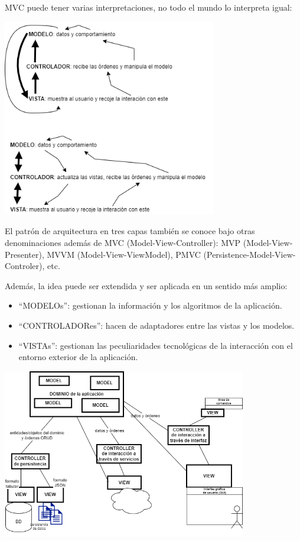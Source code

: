 \documentclass[spanish,12pt,a4paper,final,oneside]{book}
\begin{document}
MVC puede tener varias interpretaciones, no todo el mundo lo interpreta igual:
\begin{center}\includegraphics[width=0.7\textwidth]{division en capas - MVC - distintas interpretaciones}\end{center}

El patrón de arquitectura en tres capas también se conoce bajo otras denominaciones además de MVC ({\footnotesize Model-View-Controller}):  MVP ({\footnotesize Model-View-Presenter}), MVVM ({\footnotesize Model-View-ViewModel}), PMVC ({\footnotesize Persistence-Model-View-Controler}), etc.

Además, la idea puede ser extendida y ser aplicada en un sentido más amplio:
\begin{itemize}
\item ``MODELOs'': gestionan la información y los algoritmos de la aplicación.
\item ``CONTROLADORes'': hacen de adaptadores entre las vistas y los modelos.
\item ``VISTAs'': gestionan las peculiaridades tecnológicas de la interacción con el entorno exterior de la aplicación.
\end{itemize}
\begin{center}\includegraphics[width=0.8\textwidth]{division en capas - MVC -ampliada-}\end{center}
\end{document}

